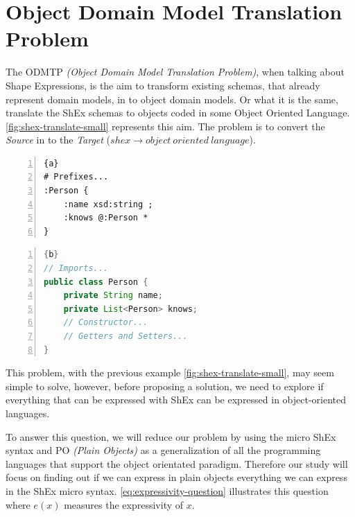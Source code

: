 \chapter{Object Domain Model Translation Problem}
\label{ch:odm-transl}

The ODMTP \textit{(Object Domain Model Translation Problem)}, when talking about
Shape Expressions, is the aim to transform existing schemas, that already represent
domain models, in to object domain models. Or what it is the same, translate the ShEx
schemas to objects coded in some Object Oriented Language. \cref{fig:shex-translate-small}
represents this aim. The problem is to convert the \textit{Source} in to the \textit{Target}
($shex \rightarrow object\ oriented\ language$).

\begin{center}
	\noindent\begin{minipage}[t]{.4\textwidth}
        \begin{lstlisting}[frame=topline,numbers=left,title=\scriptsize{Person Schema (Source)},
            basicstyle=\ttfamily\scriptsize]{a}
# Prefixes...
:Person {
	:name xsd:string ;
	:knows @:Person *
}
		\end{lstlisting}
	\end{minipage}\hfill
	\begin{minipage}[t]{.5\textwidth}
        \begin{lstlisting}[language=Java, frame=t,numbers=left,title=\scriptsize{Person Java Object (Target)},
            basicstyle=\ttfamily\scriptsize]{b}
// Imports...
public class Person {
	private String name;
	private List<Person> knows;
	// Constructor...
	// Getters and Setters...
}
		\end{lstlisting}
	\end{minipage}
	\label{fig:shex-translate-small}
\end{center}

This problem, with the previous example \cref{fig:shex-translate-small}, may seem simple to solve, however,
before proposing a solution, we need to explore if everything that can be expressed with ShEx can be
expressed in object-oriented languages.

To answer this question, we will reduce our problem by using the micro ShEx syntax and PO \textit{(Plain Objects)}
\cite{fowler1997analysis} as a generalization of all the programming languages that support the object orientated
paradigm. Therefore our study will focus on finding out if we can express in plain objects everything we can express
in the ShEx micro syntax. \cref{eq:expressivity-question} illustrates this question where $e(x)$ measures the
expressivity \cite{felleisen1991expressive} of $x$.

